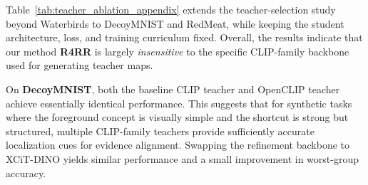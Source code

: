 \documentclass[10pt,twocolumn,letterpaper]{article}
\begin{document}
\begin{table}[h]
\caption{Teacher ablation on DecoyMNIST and RedMeat dataset: VLM and refinement backbones while keeping the student, loss, and curriculum fixed. Results are accuracy (mean$\pm$std). Higher is better.}
\label{tab:teacher_ablation_appendix}
\end{table}



Table~\ref{tab:teacher_ablation_appendix} extends the teacher-selection study beyond Waterbirds to DecoyMNIST and RedMeat, while keeping the student architecture, loss, and training curriculum fixed. Overall, the results indicate that our method \textbf{R4RR} is largely \emph{insensitive} to the specific CLIP-family backbone used for generating teacher maps.

On \textbf{DecoyMNIST}, both the baseline CLIP teacher and OpenCLIP teacher achieve essentially identical performance. This suggests that for synthetic tasks where the foreground concept is visually simple and the shortcut is strong but structured, multiple CLIP-family teachers provide sufficiently accurate localization cues for evidence alignment. Swapping the refinement backbone to XCiT-DINO yields similar performance and a small improvement in worst-group accuracy.
\end{document}
